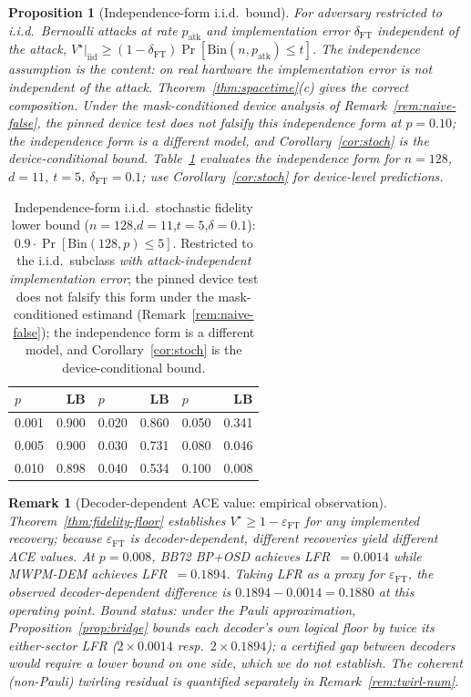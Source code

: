\documentclass[pdflatex,sn-mathphys-num]{sn-jnl}
\theoremstyle{thmstyleone}
\newtheorem{proposition}[theorem]{Proposition}
\theoremstyle{thmstyletwo}
\newtheorem{remark}{Remark}
\theoremstyle{thmstylethree}
\begin{document}
\begin{proposition}[Independence-form i.i.d.\ bound]\label{prop:stochastic}
For adversary restricted to i.i.d.\ Bernoulli attacks at rate $p_\mathrm{atk}$ and implementation error $\delta_\mathrm{FT}$ independent of the attack, $V^\star|_\mathrm{iid}\ge(1-\delta_\mathrm{FT})\Pr[\mathrm{Bin}(n,p_\mathrm{atk})\le t]$. \emph{The independence assumption is the content:} on real hardware the implementation error is \emph{not} independent of the attack. Theorem~\ref{thm:spacetime}(c) gives the correct composition. Under the mask-conditioned device analysis of Remark~\ref{rem:naive-false}, the pinned device test does not falsify this independence form at $p=0.10$; the independence form is a different model, and Corollary~\ref{cor:stoch} is the device-conditional bound. Table~\ref{tab:minimax} evaluates the independence form for $n=128$, $d=11$, $t=5$, $\delta_\mathrm{FT}=0.1$; use Corollary~\ref{cor:stoch} for device-level predictions.
\end{proposition}

\begin{table}[!htbp]\centering
\caption{Independence-form i.i.d.\ stochastic fidelity lower bound ($n=128$,$d=11$,$t=5$,$\delta=0.1$): $0.9\cdot\Pr[\mathrm{Bin}(128,p)\le5]$. Restricted to the i.i.d.\ subclass \emph{with attack-independent implementation error}; the pinned device test does not falsify this form under the mask-conditioned estimand (Remark~\ref{rem:naive-false}); the independence form is a different model, and Corollary~\ref{cor:stoch} is the device-conditional bound.}\label{tab:minimax}
\begin{tabular}{@{}lrlrlr@{}}
\toprule
$p$ & LB & $p$ & LB & $p$ & LB \\\midrule
0.001 & 0.900 & 0.020 & 0.860 & 0.050 & 0.341 \\
0.005 & 0.900 & 0.030 & 0.731 & 0.080 & 0.046 \\
0.010 & 0.898 & 0.040 & 0.534 & 0.100 & 0.008 \\\bottomrule
\end{tabular}
\end{table}

\begin{remark}[Decoder-dependent ACE value: empirical observation]\label{rem:decoder-gap}
Theorem~\ref{thm:fidelity-floor} establishes $V^\star\ge1-\varepsilon_{\mathrm{FT}}$ for any implemented recovery; because $\varepsilon_{\mathrm{FT}}$ is decoder-dependent, different recoveries yield different ACE values. At $p=0.008$, BB72 BP+OSD achieves LFR~$=0.0014$ while MWPM-DEM achieves LFR~$=0.1894$. Taking LFR as a proxy for $\varepsilon_{\mathrm{FT}}$, the observed decoder-dependent difference is $0.1894-0.0014=0.1880$ at this operating point. \emph{Bound status:} under the Pauli approximation, Proposition~\ref{prop:bridge} bounds each decoder's own logical floor by twice its either-sector LFR ($2\times0.0014$ resp.\ $2\times0.1894$); a \emph{certified gap between decoders} would require a lower bound on one side, which we do not establish. The coherent (non-Pauli) twirling residual is quantified separately in Remark~\ref{rem:twirl-num}.
\end{remark}
\end{document}
